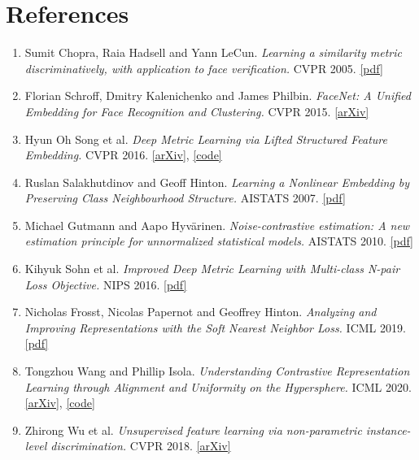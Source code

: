 \documentclass[12pt]{article}
\begin{document}
\section{References}

\begin{enumerate}
    \item Sumit Chopra, Raia Hadsell and Yann LeCun. \textit{Learning a similarity metric discriminatively, with application to face verification.} CVPR 2005. \href{http://yann.lecun.com/exdb/publis/pdf/chopra-05.pdf}{[pdf]}
    \item Florian Schroff, Dmitry Kalenichenko and James Philbin. \textit{FaceNet: A Unified Embedding for Face Recognition and Clustering.} CVPR 2015. \href{https://arxiv.org/abs/1503.03832}{[arXiv]}
    \item Hyun Oh Song et al. \textit{Deep Metric Learning via Lifted Structured Feature Embedding.} CVPR 2016. \href{https://arxiv.org/abs/1511.06452}{[arXiv]}, \href{https://github.com/rksltnl/Deep-Metric-Learning-CVPR16}{[code]}
    \item Ruslan Salakhutdinov and Geoff Hinton. \textit{Learning a Nonlinear Embedding by Preserving Class Neighbourhood Structure.} AISTATS 2007. \href{http://proceedings.mlr.press/v2/salakhutdinov07a.html}{[pdf]}
    \item Michael Gutmann and Aapo Hyvärinen. \textit{Noise-contrastive estimation: A new estimation principle for unnormalized statistical models.} AISTATS 2010. \href{http://proceedings.mlr.press/v9/gutmann10a.html}{[pdf]}
    \item Kihyuk Sohn et al. \textit{Improved Deep Metric Learning with Multi-class N-pair Loss Objective.} NIPS 2016. \href{https://papers.nips.cc/paper/2016/hash/6b180037abbebea991d8b1232f8a8ca9-Abstract.html}{[pdf]}
    \item Nicholas Frosst, Nicolas Papernot and Geoffrey Hinton. \textit{Analyzing and Improving Representations with the Soft Nearest Neighbor Loss.} ICML 2019. \href{http://proceedings.mlr.press/v97/frosst19a.html}{[pdf]}
    \item Tongzhou Wang and Phillip Isola. \textit{Understanding Contrastive Representation Learning through Alignment and Uniformity on the Hypersphere.} ICML 2020. \href{https://arxiv.org/abs/2005.10242}{[arXiv]}, \href{https://ssnl.github.io/hypersphere/}{[code]}
    \item Zhirong Wu et al. \textit{Unsupervised feature learning via non-parametric instance-level discrimination.} CVPR 2018. \href{https://arxiv.org/abs/1805.01978}{[arXiv]}

\end{enumerate}
\end{document}
